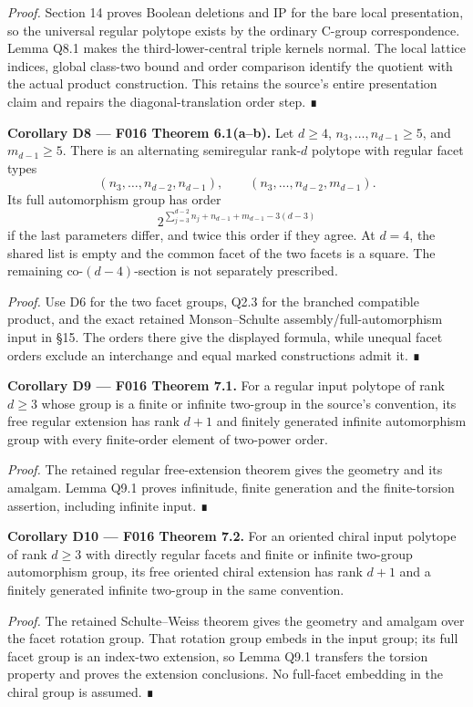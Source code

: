 \documentclass[
  10pt,
  letterpaper,
]{article}
\begin{document}
\emph{Proof.} Section 14 proves Boolean deletions and IP for the bare
local presentation, so the universal regular polytope exists by the
ordinary C-group correspondence. Lemma Q8.1 makes the
third-lower-central triple kernels normal. The local lattice indices,
global class-two bound and order comparison identify the quotient with
the actual product construction. This retains the source's entire
presentation claim and repairs the diagonal-translation order step. ∎

\textbf{Corollary D8 --- F016 Theorem 6.1(a--b).} Let \(d\ge4\),
\(n_3,\ldots,n_{d-1}\ge5\), and \(m_{d-1}\ge5\). There is an alternating
semiregular rank-\(d\) polytope with regular facet types \[
(n_3,\ldots,n_{d-2},n_{d-1}),\qquad
(n_3,\ldots,n_{d-2},m_{d-1}).
\] Its full automorphism group has order \[
2^{\sum_{j=3}^{d-2}n_j+n_{d-1}+m_{d-1}-3(d-3)}
\] if the last parameters differ, and twice this order if they agree. At
\(d=4\), the shared list is empty and the common facet of the two facets
is a square. The remaining co-\((d-4)\)-section is not separately
prescribed.

\emph{Proof.} Use D6 for the two facet groups, Q2.3 for the branched
compatible product, and the exact retained Monson--Schulte
assembly/full-automorphism input in §15. The orders there give the
displayed formula, while unequal facet orders exclude an interchange and
equal marked constructions admit it. ∎

\textbf{Corollary D9 --- F016 Theorem 7.1.} For a regular input polytope
of rank \(d\ge3\) whose group is a finite or infinite two-group in the
source's convention, its free regular extension has rank \(d+1\) and
finitely generated infinite automorphism group with every finite-order
element of two-power order.

\emph{Proof.} The retained regular free-extension theorem gives the
geometry and its amalgam. Lemma Q9.1 proves infinitude, finite
generation and the finite-torsion assertion, including infinite input. ∎

\textbf{Corollary D10 --- F016 Theorem 7.2.} For an oriented chiral
input polytope of rank \(d\ge3\) with directly regular facets and finite
or infinite two-group automorphism group, its free oriented chiral
extension has rank \(d+1\) and a finitely generated infinite two-group
in the same convention.

\emph{Proof.} The retained Schulte--Weiss theorem gives the geometry and
amalgam over the facet rotation group. That rotation group embeds in the
input group; its full facet group is an index-two extension, so Lemma
Q9.1 transfers the torsion property and proves the extension
conclusions. No full-facet embedding in the chiral group is assumed. ∎
\end{document}
